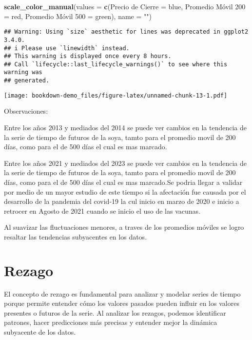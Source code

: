 \documentclass[
]{book}
\newenvironment{Shaded}{\begin{snugshade}}{\end{snugshade}}
\newcommand{\AttributeTok}[1]{\textcolor[rgb]{0.13,0.29,0.53}{#1}}
\newcommand{\FunctionTok}[1]{\textcolor[rgb]{0.13,0.29,0.53}{\textbf{#1}}}
\newcommand{\NormalTok}[1]{#1}
\newcommand{\OtherTok}[1]{\textcolor[rgb]{0.56,0.35,0.01}{#1}}
\newcommand{\StringTok}[1]{\textcolor[rgb]{0.31,0.60,0.02}{#1}}
\begin{document}
\begin{Shaded}
\begin{Highlighting}[]
  \FunctionTok{scale\_color\_manual}\NormalTok{(}\AttributeTok{values =} \FunctionTok{c}\NormalTok{(}\StringTok{\textquotesingle{}Precio de Cierre\textquotesingle{}} \OtherTok{=} \StringTok{\textquotesingle{}blue\textquotesingle{}}\NormalTok{,}
  \StringTok{\textquotesingle{}Promedio Móvil 200\textquotesingle{}} \OtherTok{=} \StringTok{\textquotesingle{}red\textquotesingle{}}\NormalTok{, }\StringTok{\textquotesingle{}Promedio Móvil 500\textquotesingle{}} \OtherTok{=} \StringTok{\textquotesingle{}green\textquotesingle{}}\NormalTok{),}
                     \AttributeTok{name =} \StringTok{""}\NormalTok{)}
\end{Highlighting}
\end{Shaded}

\begin{verbatim}
## Warning: Using `size` aesthetic for lines was deprecated in ggplot2 3.4.0.
## i Please use `linewidth` instead.
## This warning is displayed once every 8 hours.
## Call `lifecycle::last_lifecycle_warnings()` to see where this warning was
## generated.
\end{verbatim}

\texttt{[image: bookdown-demo\_files/figure-latex/unnamed-chunk-13-1.pdf]}

Observaciones:

Entre los años 2013 y mediados del 2014 se puede ver cambios en la tendencia de la serie de tiempo de futuros de la soya, tamto para el promedio movil de 200 días, como para el de 500 días el cual es mas marcado.

Entre los años 2021 y mediados del 2023 se puede ver cambios en la tendencia de la serie de tiempo de futuros de la soya, tamto para el promedio movil de 200 días, como para el de 500 días el cual es mas marcado.Se podria llegar a validar por medio de un mayor estudio de este tiempo si la afectación fue causada por el desarrollo de la pandemia del covid-19 la cul inicio en marzo de 2020 e inicio a retrocer en Agosto de 2021 cuando se inicio el uso de las vacunas.

Al suavizar las fluctuaciones menores, a traves de los promedios móviles se logro resaltar las tendencias subyacentes en los datos.

\hypertarget{rezago}{%
\chapter{Rezago}\label{rezago}}

El concepto de rezago es fundamental para analizar y modelar series de tiempo porque permite entender cómo los valores pasados pueden influir en los valores presentes o futuros de la serie. Al analizar los rezagos, podemos identificar patrones, hacer predicciones más precisas y entender mejor la dinámica subyacente de los datos.
\end{document}
